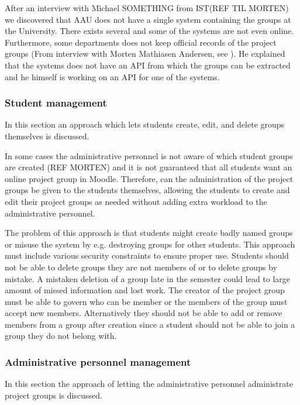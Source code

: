 After an interview with Michael SOMETHING from IST(REF TIL MORTEN) we discovered that AAU does not have a single system containing the groups at the University.
There exists several and some of the systems are not even online.
Furthermore, some departments does not keep official records of the project groups (From interview with Morten Mathiasen Andersen, see ).
He explained that the systems does not have an API from which the groups can be extracted and he himself is working on an API for one of the systems.

 


\subsubsection{Student management}
In this section an approach which lets students create, edit, and delete groups themselves is discussed. 

In some cases the administrative personnel is not aware of which student groups are created (REF MORTEN) and it is not guaranteed that all students want an online project group in Moodle. 
Therefore, can the administration of the project groups be given to the students themselves, allowing the students to create and edit their project groups as needed without adding extra workload to the administrative personnel.

The problem of this approach is that students might create badly named groups or misuse the system by e.g. destroying groups for other students. 
This approach must include various security constraints to ensure proper use. 
Students should not be able to delete groups they are not members of or to delete groups by mistake. 
A mistaken deletion of a group late in the semester could lead to large amount of missed information and lost work. 
The creator of the project group must be able to govern who can be member or the members of the group must accept new members.
Alternatively they should not be able to add or remove members from a group after creation since a student should not be able to join a group they do not belong with. 





\subsubsection{Administrative personnel management}
In this section the approach of letting the administrative personnel administrate project groups is discussed. 

